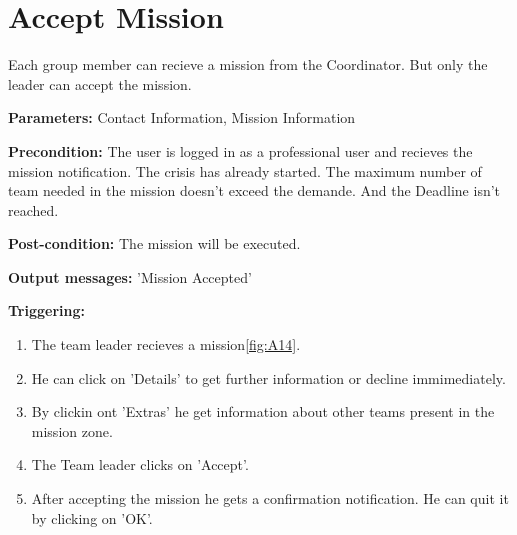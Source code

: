 \section{Accept Mission}
\label{operation:AcceptMission}
Each group member can recieve a mission from the Coordinator. But only the
leader can accept the mission.\\
\begin{description}
\item \textbf{Parameters:} Contact Information, Mission Information
\item \textbf{Precondition:} The user is logged in as a professional user
and recieves the mission notification. The crisis has already started. The
maximum number of team needed in the mission doesn't exceed the demande. And the
Deadline isn't reached.
\item \textbf{Post-condition:} The mission will be executed.
\item \textbf{Output messages:} 'Mission Accepted'
\item \textbf{Triggering:}
\begin{enumerate}
\item The team leader recieves a mission\ref{fig:A14}.
\item He can click on 'Details' to get further information or decline
immimediately.
\item By clickin ont 'Extras' he get information about other teams present in
the mission zone.
\item The Team leader clicks on 'Accept'.
\item After accepting the mission he gets a confirmation notification. He can
quit it by clicking on 'OK'.
\end{enumerate}
\end{description}  

